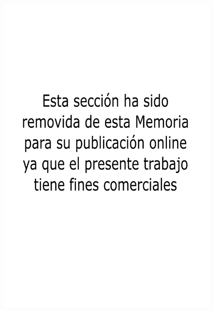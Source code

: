 \begin{figure}[!h]
	\centering
	\includegraphics[width=14cm]{./Figures/comercial.png}
\end{figure}







